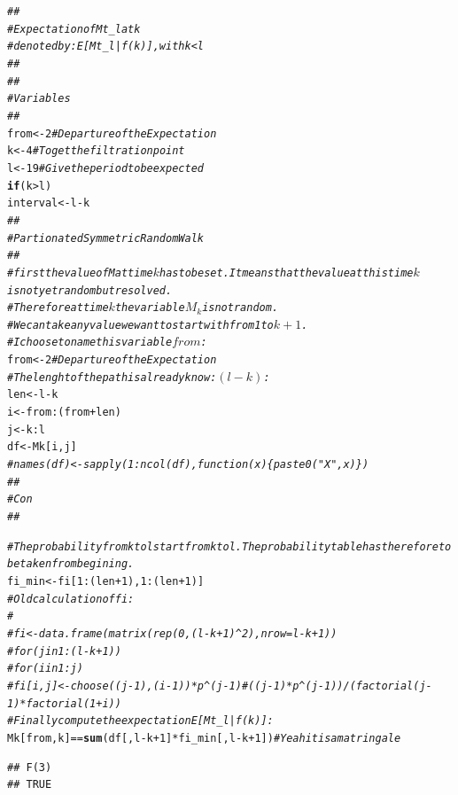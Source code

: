 \documentclass{article}\usepackage[]{graphicx}\usepackage[]{color}
\makeatletter
\newcommand{\hlnum}[1]{\textcolor[rgb]{0.686,0.059,0.569}{#1}}%
\newcommand{\hlcom}[1]{\textcolor[rgb]{0.678,0.584,0.686}{\textit{#1}}}%
\newcommand{\hlopt}[1]{\textcolor[rgb]{0,0,0}{#1}}%
\newcommand{\hlstd}[1]{\textcolor[rgb]{0.345,0.345,0.345}{#1}}%
\newcommand{\hlkwa}[1]{\textcolor[rgb]{0.161,0.373,0.58}{\textbf{#1}}}%
\newcommand{\hlkwb}[1]{\textcolor[rgb]{0.69,0.353,0.396}{#1}}%
\newcommand{\hlkwd}[1]{\textcolor[rgb]{0.737,0.353,0.396}{\textbf{#1}}}%
\newenvironment{kframe}{%
 \def\at@end@of@kframe{}%
 \ifinner\ifhmode%
  \def\at@end@of@kframe{\end{minipage}}%
  \begin{minipage}{\columnwidth}%
 \fi\fi%
 \def\FrameCommand##1{\hskip\@totalleftmargin \hskip-\fboxsep
 \colorbox{shadecolor}{##1}\hskip-\fboxsep
     \hskip-\linewidth \hskip-\@totalleftmargin \hskip\columnwidth}%
 \MakeFramed {\advance\hsize-\width
   \@totalleftmargin\z@ \linewidth\hsize
   \@setminipage}}%
 {\par\unskip\endMakeFramed%
 \at@end@of@kframe}
\newenvironment{knitrout}{}{} %
\makeatother
\begin{document}
\begin{knitrout}
\color{fgcolor}\begin{kframe}
\begin{alltt}
 \hlcom{##}
\hlcom{# Expectation of Mt_l at k}
\hlcom{# denoted by: E[Mt_l|f(k)], with k < l}
\hlcom{##}
\hlcom{##}
\hlcom{# Variables}
\hlcom{##}
\hlstd{from} \hlkwb{<-} \hlnum{2} \hlcom{# Departure of the Expectation}
\hlstd{k} \hlkwb{<-} \hlnum{4} \hlcom{# To get the filtration point }
\hlstd{l} \hlkwb{<-} \hlnum{19} \hlcom{# Give the period to be expected}
\hlkwa{if}\hlstd{(k}\hlopt{>}\hlstd{l)}
\hlstd{interval} \hlkwb{<-} \hlstd{l}\hlopt{-}\hlstd{k}
\hlcom{##}
\hlcom{# Partionated Symmetric Random Walk}
\hlcom{##}
\hlcom{# first the value of M at time $k$ has to be set. It means that the value at this time $k$ is not yet random but resolved.}
\hlcom{# Therefore at time $k$ the variable $M_k$ is not random. }
\hlcom{# We can take any value we want to start with from 1 to $k + 1$.}
\hlcom{# I choose to name this variable $from$:}
\hlstd{from} \hlkwb{<-} \hlnum{2} \hlcom{# Departure of the Expectation}
\hlcom{# The lenght of the path is already know: $(l - k)$:}
\hlstd{len} \hlkwb{<-} \hlstd{l} \hlopt{-} \hlstd{k}
\hlstd{i} \hlkwb{<-} \hlstd{from}\hlopt{:}\hlstd{(from} \hlopt{+} \hlstd{len)}
\hlstd{j} \hlkwb{<-} \hlstd{k}\hlopt{:}\hlstd{l}
\hlstd{df} \hlkwb{<-} \hlstd{Mk[i, j]}
\hlcom{# names(df) <- sapply(1:ncol(df), function(x)\{paste0("X",x)\})}
\hlcom{##}
\hlcom{# Con }
\hlcom{##}

\hlcom{# The probability from k to l start from k to l. The probability table has therefore to be taken from begining.}
\hlstd{fi_min} \hlkwb{<-} \hlstd{fi[}\hlnum{1}\hlopt{:}\hlstd{(len}\hlopt{+}\hlnum{1}\hlstd{),} \hlnum{1}\hlopt{:}\hlstd{(len}\hlopt{+}\hlnum{1}\hlstd{)]}
\hlcom{# Old calculation of fi:}
\hlcom{# }
\hlcom{# fi <- data.frame(matrix(rep(0, (l-k + 1)^2), nrow = l-k + 1))}
\hlcom{# for(j in 1:(l-k+1))}
\hlcom{#   for(i in 1:j)}
\hlcom{#     fi[i, j] <- choose((j-1), (i-1)) * p^(j-1)#((j-1)*p^(j-1))/(factorial(j-1)*factorial(1+i))}
\hlcom{# Finally compute the expectation E[Mt_l|f(k)]:}
\hlstd{Mk[from, k]} \hlopt{==} \hlkwd{sum}\hlstd{(df[, l}\hlopt{-}\hlstd{k}\hlopt{+}\hlnum{1}\hlstd{]} \hlopt{*} \hlstd{fi_min[, l}\hlopt{-}\hlstd{k}\hlopt{+}\hlnum{1}\hlstd{])} \hlcom{#Yeah it is a matringale}
\end{alltt}
\begin{verbatim}
## F(3) 
## TRUE
\end{verbatim}
\end{kframe}
\end{knitrout}
\end{document}
